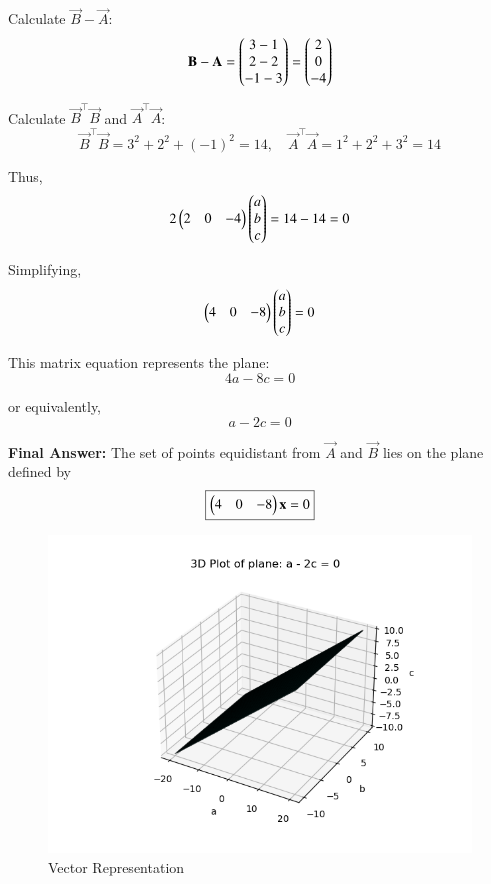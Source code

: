 \documentclass[journal]{IEEEtran}
\begin{document}
Calculate \(\vec{B} - \vec{A}\):
\begin{equation}
\mathbf{B} - \mathbf{A} = \begin{pmatrix}3 - 1 \\ 2 - 2 \\ -1 - 3\end{pmatrix} = \begin{pmatrix}2 \\ 0 \\ -4\end{pmatrix}
\end{equation}

Calculate \(\vec{B}^\top \vec{B}\) and \(\vec{A}^\top \vec{A}\):
\begin{equation}
\vec{B}^\top \vec{B} = 3^2 + 2^2 + (-1)^2 = 14, \quad
\vec{A}^\top \vec{A} = 1^2 + 2^2 + 3^2 = 14
\end{equation}

Thus,
\begin{equation}
2 \begin{pmatrix}2 & 0 & -4\end{pmatrix} \begin{pmatrix}a \\ b \\ c\end{pmatrix} = 14 - 14 = 0
\end{equation}

Simplifying,
\begin{equation}
\begin{pmatrix}4 & 0 & -8\end{pmatrix} \begin{pmatrix}a \\ b \\ c\end{pmatrix} = 0
\end{equation}

This matrix equation represents the plane:
\begin{equation}
4a - 8c = 0
\end{equation}

or equivalently,
\begin{equation}
a - 2c = 0
\end{equation}

\textbf{Final Answer:} The set of points equidistant from \(\vec{A}\) and \(\vec{B}\) lies on the plane defined by
\[
\boxed{
\begin{pmatrix}4 & 0 & -8\end{pmatrix} \mathbf{x} = 0
}
\]


\begin{figure}[htbp]
    \centering
    \includegraphics[width=0.65\linewidth]{FIG/fig1.png}
    \caption{Vector Representation}
    \label{fig:FIG/fig1.png}
    \end{figure}
\end{document}

